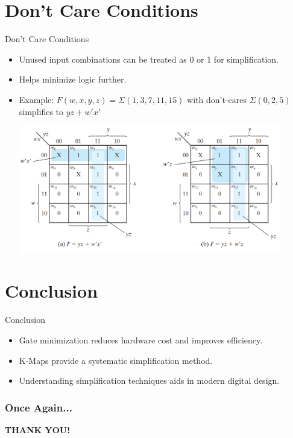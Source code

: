 \documentclass[Serif, 10pt, brown]{beamer}
\theoremstyle{example}
\theoremstyle{plain}
\begin{document}
\section[Don't Care Conditions]{Don't Care Conditions}
\begin{frame}{Don't Care Conditions}
    \begin{itemize}
        \item Unused input combinations can be treated as 0 or 1 for simplification.
        \item Helps minimize logic further.
        \item Example: \( F(w,x,y,z) = \Sigma(1,3,7,11,15) \) with don't-cares \( \Sigma(0,2,5) \) simplifies to \( yz + w'x' \)
        \begin{center}
        \includegraphics[width=0.9\textwidth]{figs/don.png}
    \end{center}
    \end{itemize}
\end{frame}


\section[Conclusion]{Conclusion}
\begin{frame}{Conclusion}
    \begin{itemize}
        \item Gate minimization reduces hardware cost and improves efficiency.
        \item K-Maps provide a systematic simplification method.
        \item Understanding simplification techniques aids in modern digital design.
    \end{itemize}
\end{frame}




\begin{frame}
	\frametitle{Once Again...}
	\begin{block}{ }
		\begin{center} \alert{\Huge\bf THANK YOU!} \end{center}
	\end{block}
\end{frame}
\end{document}
